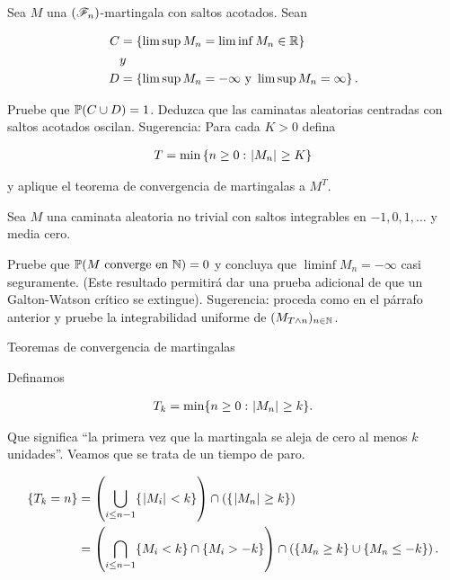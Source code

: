 \begin{problema}
    Sea $M$ una $\left( \mathscr{F}_n\right) $-martingala con saltos acotados. Sean

    \begin{align}
    C   &=  \left\{ \limsup M_n=\liminf M_n\in\mathbb{R}\right\}                  \\
        &y                                                      \\
    D   &=  \left\{ \limsup M_n=-\infty\text{ y }\limsup M_n=\infty\right\} .
    \end{align}\par\null

    Pruebe que $\mathbb{P}\! \left( C\cup D \right)=1$. Deduzca que las caminatas aleatorias centradas 
    con saltos acotados oscilan. Sugerencia: Para cada $K>0$ defina

    \begin{align}
    T=\min\left\{ n\geq 0: \hspace{.25mm}\left|M_n\right|\hspace{.25mm}\geq K\right\} 
    \end{align}

    y aplique el teorema de convergencia de martingalas a $M^T$.\par\null

    Sea $M$ una caminata aleatoria no trivial con saltos integrables en 
    $-1,0,1,\ldots$ y  media cero.\par\null 

    Pruebe que $\mathbb{P}\! \left( M\text{ converge en }\mathbb{N} \right)=0$ y  concluya que $\liminf M_n=-\infty$ 
    casi seguramente. (Este resultado permitir\'a dar una prueba adicional de que un Galton-Watson cr\'itico se extingue).  
    Sugerencia: proceda como en el párrafo anterior y pruebe la integrabilidad uniforme de $(M_{T\wedge n})_{n \in \mathbb{N}}$.

     Teoremas de convergencia de martingalas
\end{problema}

\afterstatement\par\null

Definamos 

\begin{align}
    T_k = \min\{ n \geq 0 : \hspace{.25mm}\left|M_n\right|\hspace{.25mm} \geq k \}.
\end{align}

Que significa ``la primera vez que la martingala se aleja de cero al menos $k$ unidades''. 
Veamos que se trata de un tiempo de paro.


\begin{align}
    \{ T_k = n \}   &=  \left( \bigcup_{i \leq n-1} \{ \hspace{.25mm}\left|M_i\right|\hspace{.25mm} < k \}\right)  \cap \left( \{ \hspace{.25mm}\left|M_n\right|\hspace{.25mm} \geq k \}\right)                                  \\
                    &=  \left( \bigcap_{i \leq n-1} \{ M_i < k \} \cap \{ M_i > -k \}\right)  \cap \left( \{ M_n \geq k \} \cup \{ M_n \leq -k \}\right) .
\end{align}\par\null

